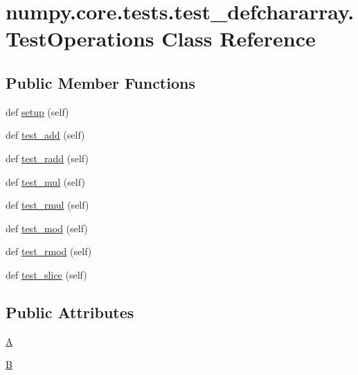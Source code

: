 \hypertarget{classnumpy_1_1core_1_1tests_1_1test__defchararray_1_1TestOperations}{}\section{numpy.\+core.\+tests.\+test\+\_\+defchararray.\+Test\+Operations Class Reference}
\label{classnumpy_1_1core_1_1tests_1_1test__defchararray_1_1TestOperations}
\subsection*{Public Member Functions}
\begin{DoxyCompactItemize}
\item 
def \hyperlink{classnumpy_1_1core_1_1tests_1_1test__defchararray_1_1TestOperations_a1f6e2a24ba36fa1d99d11786131d64ca}{setup} (self)
\item 
def \hyperlink{classnumpy_1_1core_1_1tests_1_1test__defchararray_1_1TestOperations_a3a0e50be31a9f7d721d3e1b0d9936c86}{test\+\_\+add} (self)
\item 
def \hyperlink{classnumpy_1_1core_1_1tests_1_1test__defchararray_1_1TestOperations_ac64ee2b299206a99521ed946326fed17}{test\+\_\+radd} (self)
\item 
def \hyperlink{classnumpy_1_1core_1_1tests_1_1test__defchararray_1_1TestOperations_a1f49806ad1d77b5a272cbbffc4a67c6a}{test\+\_\+mul} (self)
\item 
def \hyperlink{classnumpy_1_1core_1_1tests_1_1test__defchararray_1_1TestOperations_aaa73e5b29cc9394673fe1a31feb73e4a}{test\+\_\+rmul} (self)
\item 
def \hyperlink{classnumpy_1_1core_1_1tests_1_1test__defchararray_1_1TestOperations_ac4a7f2db1ba147cda043816081a19324}{test\+\_\+mod} (self)
\item 
def \hyperlink{classnumpy_1_1core_1_1tests_1_1test__defchararray_1_1TestOperations_ad629c0bf4800d3edff0ab310ebc4d27f}{test\+\_\+rmod} (self)
\item 
def \hyperlink{classnumpy_1_1core_1_1tests_1_1test__defchararray_1_1TestOperations_a0a472938a819304e978ef27e965aca10}{test\+\_\+slice} (self)
\end{DoxyCompactItemize}
\subsection*{Public Attributes}
\begin{DoxyCompactItemize}
\item 
\hyperlink{classnumpy_1_1core_1_1tests_1_1test__defchararray_1_1TestOperations_aff00437f66ae7cbf1dce9debfe65dd62}{A}
\item 
\hyperlink{classnumpy_1_1core_1_1tests_1_1test__defchararray_1_1TestOperations_a6e9d6db3830b395679000ed9aa284376}{B}
\end{DoxyCompactItemize}



